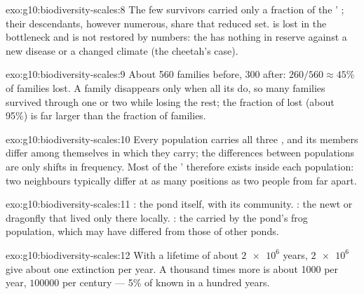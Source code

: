 \begin{solution}{exo:g10:biodiversity-scales:8}
The few survivors carried only a fraction of the ' ;
their descendants, however numerous, share that reduced set.  is lost in the bottleneck and is not restored by numbers:
the  has nothing in reserve against a new disease or a changed
climate (the cheetah's case).
\end{solution}

\begin{solution}{exo:g10:biodiversity-scales:9}
About 560 families before, 300 after: $260/560 \approx 45\%$ of
families lost. A family disappears only when all its  do, so
many families survived through one or two  while losing the
rest; the fraction of  lost (about 95\%) is far larger than
the fraction of families.
\end{solution}

\begin{solution}{exo:g10:biodiversity-scales:10}
Every population carries all three , and its members differ
among themselves in which they carry; the differences between
populations are only shifts in frequency. Most of the '  therefore exists inside each population: two neighbours
typically differ at as many positions as two people from far apart.
\end{solution}

\begin{solution}{exo:g10:biodiversity-scales:11}
: the pond itself, with its community. : the newt or
dragonfly that lived only there locally. : the  carried by
the pond's frog population, which may have differed from those of
other ponds.
\end{solution}

\begin{solution}{exo:g10:biodiversity-scales:12}
With a lifetime of about $\num{2e6}$ years, $\num{2e6}$  give
about one extinction per year. A thousand times more is about 1000
 per year, $\num{100000}$ per century --- 5\% of known 
in a hundred years.
\end{solution}

